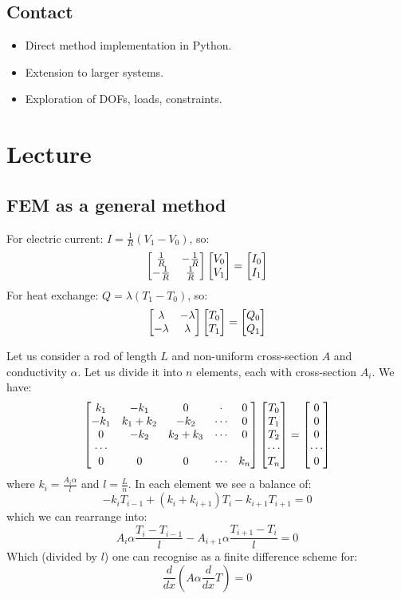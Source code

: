 \documentclass[12pt]{article}
\begin{document}
\newpage


\subsection*{Contact}

\begin{itemize}
    \item Direct method implementation in Python.
    \item Extension to larger systems.
    \item Exploration of DOFs, loads, constraints.
\end{itemize}



\section{Lecture}
\subsection{FEM as a general method}
For electric current: $I = \frac{1}{R}(V_1-V_0)$, so:
\[\left[\begin{matrix}\frac{1}{R} & -\frac{1}{R}\\-\frac{1}{R} & \frac{1}{R}\end{matrix}\right]\left[\begin{matrix}V_0\\V_1\end{matrix}\right]=\left[\begin{matrix}I_0\\I_1\end{matrix}\right]\]
For heat exchange: $Q = \lambda(T_1-T_0)$, so:
\[\left[\begin{matrix}\lambda & -\lambda\\-\lambda & \lambda\end{matrix}\right]\left[\begin{matrix}T_0\\T_1\end{matrix}\right]=\left[\begin{matrix}Q_0\\Q_1\end{matrix}\right]\]

Let us consider a rod of length $L$ and non-uniform cross-section $A$ and conductivity $\alpha$. Let us divide it into $n$ elements, each with cross-section $A_i$. We have:
\[\left[\begin{matrix}k_1 & -k_1 & 0 & \cdot & 0\\
-k_1 & k_1+k_2 & -k_2 &  \cdots & 0\\
0 & -k_2 & k_2+k_3 & \cdots & 0\\
\cdots\\
0 & 0 & 0 & \cdots & k_n\end{matrix}\right]\left[\begin{matrix}T_0\\T_1\\T_2\\\cdots\\T_n\end{matrix}\right] = \left[\begin{matrix}0\\0\\0\\\cdots\\0\end{matrix}\right]\]
where $k_i=\frac{A_i\alpha}{l}$ and $l=\frac{L}{n}$. In each element we see a balance of:
\[-k_iT_{i-1}+(k_i+k_{i+1})T_{i}-k_{i+1}T_{i+1} = 0\]
which we can rearrange into:
\[A_i\alpha\frac{T_{i}-T_{i-1}}{l}-A_{i+1}\alpha\frac{T_{i+1}-T_{i}}{l} = 0\]
Which (divided by $l$) one can recognise as a finite difference scheme for:
\[\frac{d}{dx}\left(A\alpha\frac{d}{dx}T\right)=0\]
\end{document}
